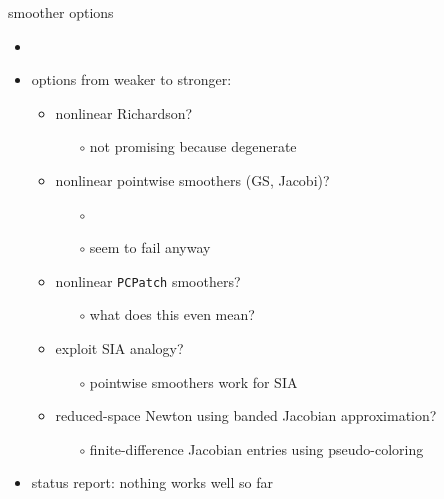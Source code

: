 \documentclass[usepdftitle=false,usenames,dvipsnames]{beamer}
\begin{document}
\begin{frame}{smoother options}

\begin{itemize}
\item {}
\item options from weaker to stronger:
    \begin{itemize}
    \item nonlinear Richardson?
        \begin{itemize}
        \item[{\color{black} $\circ$}] not promising because degenerate
        \end{itemize}
    \item nonlinear pointwise smoothers (GS, Jacobi)?
        \begin{itemize}
        \item[{\color{black} $\circ$}]  
        \item[{\color{black} $\circ$}] seem to fail anyway
        \end{itemize}
    \item nonlinear \texttt{PCPatch} smoothers?
        \begin{itemize}
        \item[{\color{black} $\circ$}] what does this even mean?
        \end{itemize}
    \item exploit SIA analogy?
        \begin{itemize}
        \item[{\color{black} $\circ$}] pointwise smoothers work for SIA
        \end{itemize}
    \item reduced-space Newton using banded Jacobian approximation?
        \begin{itemize}
        \item[{\color{black} $\circ$}] finite-difference Jacobian entries using pseudo-coloring
        \end{itemize}
    \end{itemize}

\bigskip
\item<2> status report: \alert{nothing works well so far}
\end{itemize}
\end{frame}
\end{document}
